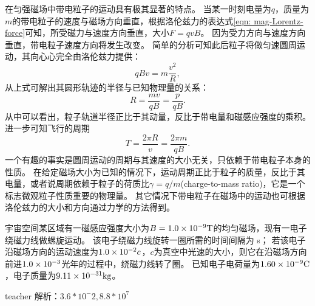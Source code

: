 在匀强磁场中带电粒子的运动具有极其显著的特点。
当某一时刻电量为$q$，质量为$m$的带电粒子的速度与磁场方向垂直，根据洛伦兹力的表达式\ref{eqn: mag-Lorentz-force}可知，所受磁力与速度方向垂直，大小$F = qvB$。
因为受力方向与速度方向垂直，带电粒子速度方向将发生改变。
简单的分析可知此后粒子将做匀速圆周运动，其向心心完全由洛伦兹力提供：
\begin{equation}
qBv = m\frac{v^2}{R},
\end{equation}
从上式可解出其圆形轨迹的半径与已知物理量的关系：
\begin{equation}
R = \frac{mv}{qB} = \frac{p}{qB}.
\end{equation}
从中可以看出，粒子轨道半径正比于其动量，反比于带电量和磁感应强度的乘积。
进一步可知飞行的周期
\begin{equation}
T = \frac{2\pi R}{v} = \frac{2 \pi m}{qB}.
\end{equation}
一个有趣的事实是圆周运动的周期与其速度的大小无关，只依赖于带电粒子本身的性质。
在给定磁场大小为已知的情况下，运动周期正比于粒子的质量，反比于其电量，或者说周期依赖于粒子的{\heiti 荷质比$\gamma=q/m$}(charge-to-mass ratio)，它是一个标志微观粒子性质重要的物理量。
其它情况下带电粒子在磁场中的运动也可根据洛伦兹力的大小和方向通过力学的方法得到。



\begin{example}

宇宙空间某区域有一磁感应强度大小为$B=1.0\times 10^{-9}{\rm{T}}$的均匀磁场，现有一电子绕磁力线做螺旋运动。
该电子绕磁力线旋转一圈所需的时间间隔为 \kong\kong s；
若该电子沿磁场方向的运动速度为$1.0\times 10^{-2}c$，$c$为真空中光速的大小，则它在沿磁场方向前进$1.0\times 10^{-3}$光年的过程中，绕磁力线转了\kong\kong 圈。
已知电子电荷量为$1.60\times 10^{-9}{\rm{C}}$，电子质量为$9.11\times 10^{-31}{\rm{kg}}$。

\begin{taggedblock}{teacher}
\noindent
解析：$3.6*10^-2,8.8*10^7$
\end{taggedblock}
\end{example}



